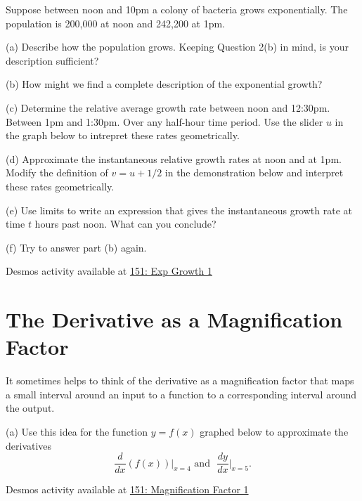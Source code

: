 \documentclass{ximera}
\begin{document}
\begin{question} \label{Qewrdfst5t}
Suppose between noon and 10pm a colony of bacteria grows exponentially. The population is 200,000 at noon and 242,200 at 1pm.

(a) Describe how the population grows. Keeping Question 2(b) in mind, is  your description sufficient?

(b) How might we find a complete description of the exponential growth?

(c) Determine the relative average growth rate between noon and 12:30pm. Between 1pm and 1:30pm. Over any half-hour time period. Use the slider $u$ in the graph below to intrepret these rates geometrically.

(d) Approximate the instantaneous relative growth rates at noon and at 1pm. Modify the definition of $v=u+1/2$ in the demonstration below and interpret these rates geometrically.

(e) Use limits to write an expression that gives the instantaneous growth rate at time $t$ hours past noon. What can you conclude? 

(f) Try to answer part (b) again.


\begin{onlineOnly}
    \begin{center}
\end{center}
\end{onlineOnly}


Desmos activity available at \href{https://www.desmos.com/calculator/wvpsotdhby}{151: Exp Growth 1}





\end{question}






\section*{The Derivative as a Magnification Factor}
\begin{exploration}   \label{Ex:325gyt}

It sometimes helps to think of the derivative as a magnification factor that maps a small interval around an input to a function to a corresponding interval around the output.

(a) Use this idea for the function $y=f(x)$ graphed below to approximate the derivatives 
\[
    \frac{d}{dx} (f(x))\Big|_{x=4} \text{  and  } \,\, \frac{dy}{dx}\Big|_{x=5} .
\]


\begin{onlineOnly}
    \begin{center}
\end{center}
\end{onlineOnly}


Desmos activity available at \href{https://www.desmos.com/calculator/la4f5ots3r}{151: Magnification Factor 1}

\end{exploration}
\end{document}
